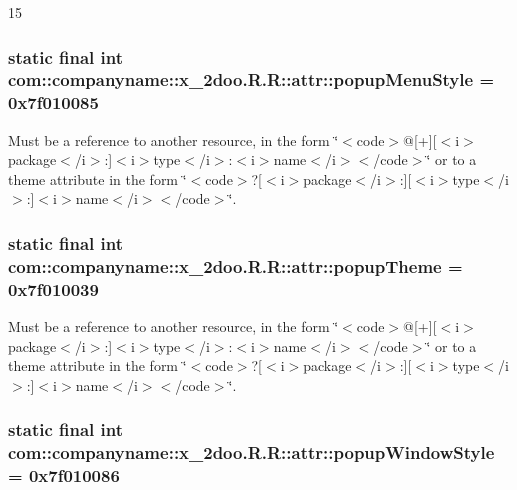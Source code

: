 15\hypertarget{classcom_1_1companyname_1_1x__2doo_1_1_r_1_1attr_cc7a9c0c6f39487c3979a935eeaa6bc4}{
\subsubsection[{popupMenuStyle}]{\setlength{\rightskip}{0pt plus 5cm}static final int com::companyname::x\_\-2doo.R.R::attr::popupMenuStyle = 0x7f010085}}
\label{classcom_1_1companyname_1_1x__2doo_1_1_r_1_1attr_cc7a9c0c6f39487c3979a935eeaa6bc4}


Must be a reference to another resource, in the form \char`\"{}$<$code$>$@\mbox{[}+\mbox{]}\mbox{[}$<$i$>$package$<$/i$>$:\mbox{]}$<$i$>$type$<$/i$>$:$<$i$>$name$<$/i$>$$<$/code$>$\char`\"{} or to a theme attribute in the form \char`\"{}$<$code$>$?\mbox{[}$<$i$>$package$<$/i$>$:\mbox{]}\mbox{[}$<$i$>$type$<$/i$>$:\mbox{]}$<$i$>$name$<$/i$>$$<$/code$>$\char`\"{}. \hypertarget{classcom_1_1companyname_1_1x__2doo_1_1_r_1_1attr_d403115dfb9e747c8d3dcd84eb00fe4b}{
\subsubsection[{popupTheme}]{\setlength{\rightskip}{0pt plus 5cm}static final int com::companyname::x\_\-2doo.R.R::attr::popupTheme = 0x7f010039}}
\label{classcom_1_1companyname_1_1x__2doo_1_1_r_1_1attr_d403115dfb9e747c8d3dcd84eb00fe4b}


Must be a reference to another resource, in the form \char`\"{}$<$code$>$@\mbox{[}+\mbox{]}\mbox{[}$<$i$>$package$<$/i$>$:\mbox{]}$<$i$>$type$<$/i$>$:$<$i$>$name$<$/i$>$$<$/code$>$\char`\"{} or to a theme attribute in the form \char`\"{}$<$code$>$?\mbox{[}$<$i$>$package$<$/i$>$:\mbox{]}\mbox{[}$<$i$>$type$<$/i$>$:\mbox{]}$<$i$>$name$<$/i$>$$<$/code$>$\char`\"{}. \hypertarget{classcom_1_1companyname_1_1x__2doo_1_1_r_1_1attr_f03bd7e649c2bce0a4a14b45011cefa6}{
\subsubsection[{popupWindowStyle}]{\setlength{\rightskip}{0pt plus 5cm}static final int com::companyname::x\_\-2doo.R.R::attr::popupWindowStyle = 0x7f010086}}
\label{classcom_1_1companyname_1_1x__2doo_1_1_r_1_1attr_f03bd7e649c2bce0a4a14b45011cefa6}


